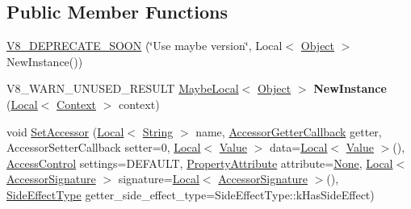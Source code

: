 \subsection*{Public Member Functions}
\begin{DoxyCompactItemize}
\item 
\mbox{\hyperlink{classv8_1_1ObjectTemplate_abfa44addb7c9b426036a34bc7e60cc20}{V8\+\_\+\+D\+E\+P\+R\+E\+C\+A\+T\+E\+\_\+\+S\+O\+ON}} (\char`\"{}Use maybe version\char`\"{}, Local$<$ \mbox{\hyperlink{classv8_1_1Object}{Object}} $>$ New\+Instance())
\item 
\mbox{\label{classv8_1_1ObjectTemplate_ab6903ae25b5ffb081f1802df6b7fe6d7}} 
V8\+\_\+\+W\+A\+R\+N\+\_\+\+U\+N\+U\+S\+E\+D\+\_\+\+R\+E\+S\+U\+LT \mbox{\hyperlink{classv8_1_1MaybeLocal}{Maybe\+Local}}$<$ \mbox{\hyperlink{classv8_1_1Object}{Object}} $>$ {\bfseries New\+Instance} (\mbox{\hyperlink{classv8_1_1Local}{Local}}$<$ \mbox{\hyperlink{classv8_1_1Context}{Context}} $>$ context)
\item 
void \mbox{\hyperlink{classv8_1_1ObjectTemplate_a878a503e6bae8b401a0631febf05cf8c}{Set\+Accessor}} (\mbox{\hyperlink{classv8_1_1Local}{Local}}$<$ \mbox{\hyperlink{classv8_1_1String}{String}} $>$ name, \mbox{\hyperlink{namespacev8_a722613c87061708a4f1aa050d095f868}{Accessor\+Getter\+Callback}} getter, Accessor\+Setter\+Callback setter=0, \mbox{\hyperlink{classv8_1_1Local}{Local}}$<$ \mbox{\hyperlink{classv8_1_1Value}{Value}} $>$ data=\mbox{\hyperlink{classv8_1_1Local}{Local}}$<$ \mbox{\hyperlink{classv8_1_1Value}{Value}} $>$(), \mbox{\hyperlink{namespacev8_a31d8355cb043d7d2dda3f4a52760b64e}{Access\+Control}} settings=D\+E\+F\+A\+U\+LT, \mbox{\hyperlink{namespacev8_a05f25f935e108a1ea2d150e274602b87}{Property\+Attribute}} attribute=\mbox{\hyperlink{namespacev8_a05f25f935e108a1ea2d150e274602b87a7ab4d58719c33b3ea2dfaefa29b111df}{None}}, \mbox{\hyperlink{classv8_1_1Local}{Local}}$<$ \mbox{\hyperlink{classv8_1_1AccessorSignature}{Accessor\+Signature}} $>$ signature=\mbox{\hyperlink{classv8_1_1Local}{Local}}$<$ \mbox{\hyperlink{classv8_1_1AccessorSignature}{Accessor\+Signature}} $>$(), \mbox{\hyperlink{namespacev8_a29711319c2b9fc7716d65faee2f7b9cb}{Side\+Effect\+Type}} getter\+\_\+side\+\_\+effect\+\_\+type=Side\+Effect\+Type\+::k\+Has\+Side\+Effect)
\item 
\mbox{\label{classv8_1_1ObjectTemplate_a5b8e517d687f26df9fc3963dcb04f8bf}} 

\end{DoxyCompactItemize}
